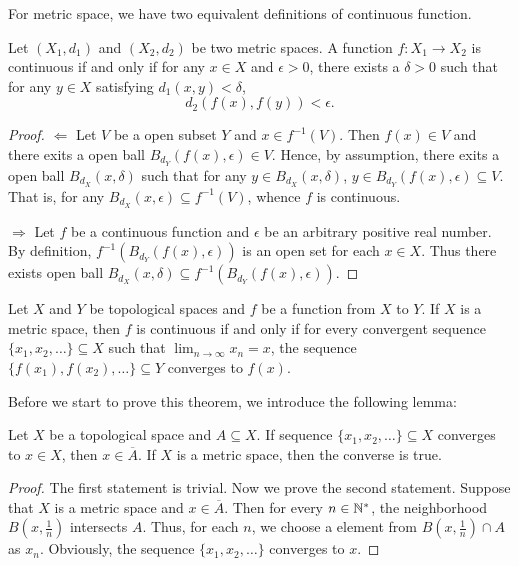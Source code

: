 For metric space, we have two equivalent definitions of continuous function. 
\begin{thm}
Let $(X_1, d_1)$ and $(X_2, d_2)$ be two metric spaces. A function 
$f: X_1 \to X_2$ is continuous if and only if for any $x \in X$ and 
$\epsilon > 0$, there exists a $\delta > 0$ such that for any $y \in X$ 
satisfying $d_1(x, y) < \delta$, 
\begin{equation*}
    d_2(f(x), f(y)) < \epsilon. 
\end{equation*}
\end{thm}
\begin{proof}
$\Leftarrow$
Let $V$ be a open subset $Y$ and $x \in f^{-1}(V)$. 
Then $f(x) \in V$ and there exits a open ball $B_{d_Y}(f(x), \epsilon) 
\in V$. 
Hence, by assumption, there exits a open ball $B_{d_X}(x, \delta)$ such 
that for any $y \in B_{d_X}(x, \delta)$, $y \in B_{d_Y}(f(x), \epsilon) 
\subseteq V$. 
That is, for any $B_{d_X}(x, \epsilon) \subseteq f^{-1}(V)$, whence $f$ is 
continuous. 

$\Rightarrow$ 
Let $f$ be a continuous function and $\epsilon$ be an arbitrary positive 
real number. 
By definition, $f^{-1}(B_{d_Y}(f(x), \epsilon))$ is an open set for each 
$x \in X$. 
Thus there exists open ball $B_{d_X}(x, \delta) \subseteq 
f^{-1}(B_{d_Y}(f(x), \epsilon))$. 
\end{proof}

\begin{thm}
\label{thm:metric_space:continuous_function:2}
Let $X$ and $Y$ be topological spaces and $f$ be a function from $X$ to $Y$. 
If $X$ is a metric space, then $f$ is continuous if and only if for every 
convergent sequence $\{x_1, x_2, \ldots\} \subseteq X$ such that 
$\lim_{n \to \infty} x_n = x$, the sequence $\{f(x_1), f(x_2), \ldots\} 
\subseteq Y$ converges to $f(x)$. 
\end{thm}

Before we start to prove this theorem, we introduce the following lemma:
\begin{lemma}
\label{thm:metric_spaces:sequence_lemma}
Let $X$ be a topological space and $A \subseteq X$. 
If sequence $\{x_1, x_2, \ldots\} \subseteq X$ converges to $x \in X$, then 
$x \in \overline{A}$. 
If $X$ is a metric space, then the converse is true. 
\end{lemma}
\begin{proof}
The first statement is trivial. 
Now we prove the second statement. 
Suppose that $X$ is a metric space and $x \in \overline{A}$. 
Then for every $n \in \mathbb{N}^\ast$, the neighborhood $B(x, \frac{1}{n})$ 
intersects $A$. 
Thus, for each $n$, we choose a element from $B(x, \frac{1}{n}) \cap A$ 
as $x_n$. 
Obviously, the sequence $\{x_1, x_2, \ldots\}$ converges to $x$. 
\end{proof}

